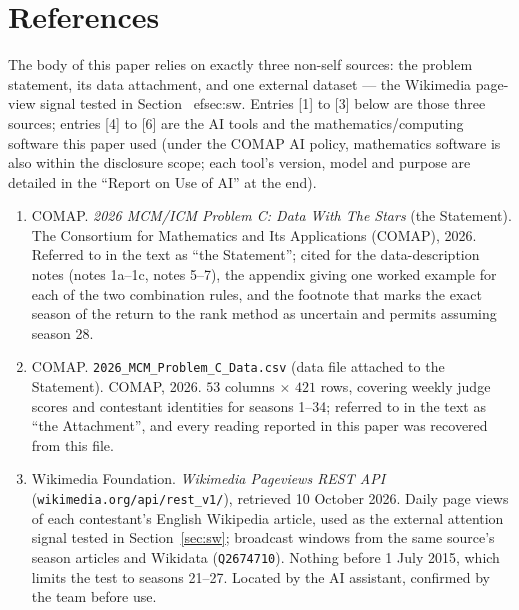 %
%
\section{References}
\label{sec:refs}

The body of this paper relies on exactly three non-self sources: the problem statement, its data attachment, and one external dataset --- the Wikimedia page-view signal tested in Section~
ef{sec:sw}. Entries [1] to [3] below are those three sources; entries [4] to [6] are the AI tools and the mathematics/computing software this paper used (under the COMAP AI policy, mathematics software is also within the disclosure scope; each tool's version, model and purpose are detailed in the ``Report on Use of AI'' at the end).

\begin{enumerate}
  \item COMAP. \emph{2026 MCM/ICM Problem C: Data With The Stars} (the Statement). The Consortium for Mathematics and Its Applications (COMAP), 2026. Referred to in the text as ``the Statement''; cited for the data-description notes (notes 1a--1c, notes 5--7), the appendix giving one worked example for each of the two combination rules, and the footnote that marks the exact season of the return to the rank method as uncertain and permits assuming season 28.
  \item COMAP. \texttt{2026\_MCM\_Problem\_C\_Data.csv} (data file attached to the Statement). COMAP, 2026. $53$ columns $\times$ $421$ rows, covering weekly judge scores and contestant identities for seasons 1--34; referred to in the text as ``the Attachment'', and every reading reported in this paper was recovered from this file.
  \item Wikimedia Foundation. \emph{Wikimedia Pageviews REST API} (\texttt{wikimedia.org/api/rest\_v1/}), retrieved 10 October 2026. Daily page views of each contestant's English Wikipedia article, used as the external attention signal tested in Section~\ref{sec:sw}; broadcast windows from the same source's season articles and Wikidata (\texttt{Q2674710}). Nothing before 1 July 2015, which limits the test to seasons 21--27. Located by the AI assistant, confirmed by the team before use.
\end{enumerate}

